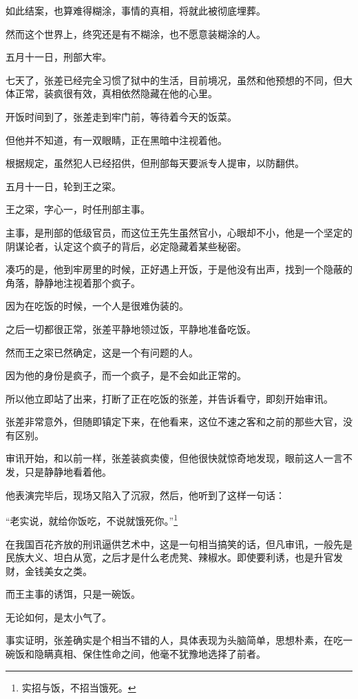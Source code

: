 \begin{multicols}{\theparacolNo}
		如此结案，也算难得糊涂，事情的真相，将就此被彻底埋葬。

		然而这个世界上，终究还是有不糊涂，也不愿意装糊涂的人。

		五月十一日，刑部大牢。

		七天了，张差已经完全习惯了狱中的生活，目前境况，虽然和他预想的不同，但大体正常，装疯很有效，真相依然隐藏在他的心里。

		开饭时间到了，张差走到牢门前，等待着今天的饭菜。

		但他并不知道，有一双眼睛，正在黑暗中注视着他。

		根据规定，虽然犯人已经招供，但刑部每天要派专人提审，以防翻供。

		五月十一日，轮到王之寀。

		王之寀，字心一，时任刑部主事。

		主事，是刑部的低级官员，而这位王先生虽然官小，心眼却不小，他是一个坚定的阴谋论者，认定这个疯子的背后，必定隐藏着某些秘密。

		凑巧的是，他到牢房里的时候，正好遇上开饭，于是他没有出声，找到一个隐蔽的角落，静静地注视着那个疯子。

		因为在吃饭的时候，一个人是很难伪装的。

		之后一切都很正常，张差平静地领过饭，平静地准备吃饭。

		然而王之寀已然确定，这是一个有问题的人。

		因为他的身份是疯子，而一个疯子，是不会如此正常的。

		所以他立即站了出来，打断了正在吃饭的张差，并告诉看守，即刻开始审讯。

		张差非常意外，但随即镇定下来，在他看来，这位不速之客和之前的那些大官，没有区别。

		审讯开始，和以前一样，张差装疯卖傻，但他很快就惊奇地发现，眼前这人一言不发，只是静静地看着他。

		他表演完毕后，现场又陷入了沉寂，然后，他听到了这样一句话：

		“老实说，就给你饭吃，不说就饿死你。”\footnote{实招与饭，不招当饿死。}

		在我国百花齐放的刑讯逼供艺术中，这是一句相当搞笑的话，但凡审讯，一般先是民族大义、坦白从宽，之后才是什么老虎凳、辣椒水。即使要利诱，也是升官发财，金钱美女之类。

		而王主事的诱饵，只是一碗饭。

		无论如何，是太小气了。

		事实证明，张差确实是个相当不错的人，具体表现为头脑简单，思想朴素，在吃一碗饭和隐瞒真相、保住性命之间，他毫不犹豫地选择了前者。


\end{multicols}
